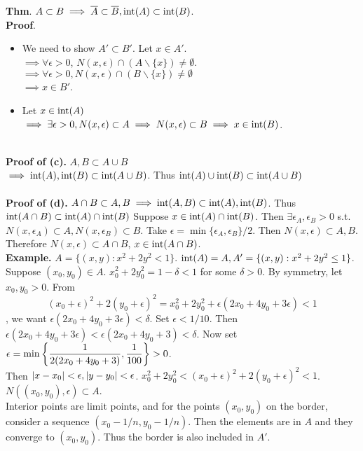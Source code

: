 \pagebreak
\textbf{Thm}. $A\subset B \implies \overline{A}\subset \overline{B}, \mathrm{int}(A)\subset \mathrm{int}(B)$.\\
\textbf{Proof}. 
\begin{itemize}
	\item We need to show $A'\subset B'$. Let $x\in A'$.\\
	$\implies$$\forall \epsilon > 0$, $N(x, \epsilon)\cap (A\backslash \{x\}) \neq\emptyset$. \\
	$\implies \forall \epsilon > 0, N(x, \epsilon)\cap (B\backslash \{x\})\neq \emptyset$\\
	$\implies x\in B'$.
	\item Let $x\in \mathrm{int}(A)$\\
	$\implies \exists \epsilon > 0, N(x, \epsilon) \subset A \implies N(x, \epsilon) \subset B \implies x\in \mathrm{int}(B)$.
\end{itemize}
~\\
\textbf{Proof of (c).} $A, B\subset A\cup B$ \\$\implies \mathrm{int}(A), \mathrm{int}(B)\subset \mathrm{int}(A\cup B)$. Thus $\mathrm{int}(A)\cup \mathrm{int}(B)\subset \mathrm{int}(A\cup B)$\\
\\
\textbf{Proof of (d).} $A\cap B \subset A, B \implies \mathrm{int}(A, B) \subset \mathrm{int}(A), \mathrm{int}(B)$. Thus $\mathrm{int}(A\cap B)\subset \mathrm{int}(A)\cap \mathrm{int}(B)$
Suppose $x\in \mathrm{int}(A)\cap \mathrm{int}(B)$. Then $\exists \epsilon_A, \epsilon_B > 0$ s.t. $N(x, \epsilon_A)\subset A, N(x, \epsilon_B)\subset B$. Take $\epsilon = \min\{\epsilon_A, \epsilon_B \}/ 2$. Then $N(x, \epsilon) \subset A, B$. Therefore $N(x, \epsilon) \subset A\cap B$, $x\in \mathrm{int}(A\cap B)$.
~\\
\textbf{Example.} $A = \{(x, y):x^2+2y^2<1 \}$. $\mathrm{int}(A) = A, A' = \{(x, y): x^2+2y^2\leq 1 \}$.\\
Suppose $(x_0, y_0) \in A$. $x_0^2 + 2y_0^2 = 1-\delta < 1$ for some $\delta >0$. By symmetry, let $x_0, y_0 >0$. From
$$(x_0+\epsilon)^2 + 2(y_0+\epsilon)^2 = x_0^2 +2y_0^2 + \epsilon(2x_0 + 4y_0 + 3\epsilon) < 1$$
, we want $\epsilon(2x_0+4y_0+3\epsilon) < \delta$. Set $\epsilon < 1/10$. Then $\epsilon(2x_0 + 4y_0 + 3\epsilon) < \epsilon(2x_0 + 4y_0 +3) < \delta$. Now set $\epsilon = \min\left\{\displaystyle \frac{1}{2 (2x_0+4y_0+3)}, \frac{1}{100}\right\} > 0$.\\ Then $\left|x - x_0\right|<\epsilon, \left|y-y_0\right|<\epsilon$. $x_0^2+2y_0^2 < (x_0+\epsilon) ^2 + 2(y_0+\epsilon)^2 <1$. $N((x_0, y_0), \epsilon) \subset A$.\\
Interior points are limit points, and for the points $(x_0, y_0)$ on the border, consider a sequence $(x_0-1/n, y_0-1/n)$. Then the elements are in $A$ and they converge to $(x_0, y_0)$. Thus the border is also included in $A'$.
\pagebreak